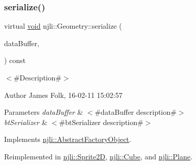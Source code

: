 \mbox{\label{classnjli_1_1_geometry_a42a35911278eb52e0013d6dadd80271d}} 
\subsubsection{\texorpdfstring{serialize()}{serialize()}}
{\footnotesize\ttfamily virtual \mbox{\hyperlink{_thread_8h_af1e856da2e658414cb2456cb6f7ebc66}{void}} njli\+::\+Geometry\+::serialize (\begin{DoxyParamCaption}\item[{\mbox{\hyperlink{_thread_8h_af1e856da2e658414cb2456cb6f7ebc66}{void}} $\ast$}]{data\+Buffer,  }\item[{bt\+Serializer $\ast$}]{ }\end{DoxyParamCaption}) const\hspace{0.3cm}{\ttfamily [virtual]}}



$<$\#\+Description\#$>$ 

\begin{DoxyAuthor}{Author}
James Folk, 16-\/02-\/11 15\+:02\+:57
\end{DoxyAuthor}

\begin{DoxyParams}{Parameters}
{\em data\+Buffer} & $<$\#data\+Buffer description\#$>$ \\
\hline
{\em bt\+Serializer} & $<$\#bt\+Serializer description\#$>$ \\
\hline
\end{DoxyParams}


Implements \mbox{\hyperlink{classnjli_1_1_abstract_factory_object_aad2fbe86fb3bdecf02918a96b9c57976}{njli\+::\+Abstract\+Factory\+Object}}.



Reimplemented in \mbox{\hyperlink{classnjli_1_1_sprite2_d_ae372ea409ac67b1585e7928bffe5f502}{njli\+::\+Sprite2D}}, \mbox{\hyperlink{classnjli_1_1_cube_a00652e991c099a535207194c73324c65}{njli\+::\+Cube}}, and \mbox{\hyperlink{classnjli_1_1_plane_a3a3dd9c8e6f4a7a8304732b80c1ce68f}{njli\+::\+Plane}}.

\mbox{\label{classnjli_1_1_geometry_a4fc4bcd9d1930911474210c047372fc0}} 
